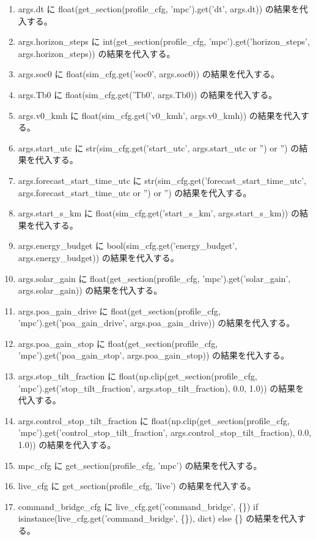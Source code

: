 \documentclass[a4paper,11pt]{article}
\begin{document}
\begin{enumerate}[leftmargin=1.8em]
\item args.dt に float(get\_section(profile\_cfg, 'mpc').get('dt', args.dt)) の結果を代入する。
\item args.horizon\_steps に int(get\_section(profile\_cfg, 'mpc').get('horizon\_steps', args.horizon\_steps)) の結果を代入する。
\item args.soc0 に float(sim\_cfg.get('soc0', args.soc0)) の結果を代入する。
\item args.Tb0 に float(sim\_cfg.get('Tb0', args.Tb0)) の結果を代入する。
\item args.v0\_kmh に float(sim\_cfg.get('v0\_kmh', args.v0\_kmh)) の結果を代入する。
\item args.start\_utc に str(sim\_cfg.get('start\_utc', args.start\_utc or '') or '') の結果を代入する。
\item args.forecast\_start\_time\_utc に str(sim\_cfg.get('forecast\_start\_time\_utc', args.forecast\_start\_time\_utc or '') or '') の結果を代入する。
\item args.start\_s\_km に float(sim\_cfg.get('start\_s\_km', args.start\_s\_km)) の結果を代入する。
\item args.energy\_budget に bool(sim\_cfg.get('energy\_budget', args.energy\_budget)) の結果を代入する。
\item args.solar\_gain に float(get\_section(profile\_cfg, 'mpc').get('solar\_gain', args.solar\_gain)) の結果を代入する。
\item args.poa\_gain\_drive に float(get\_section(profile\_cfg, 'mpc').get('poa\_gain\_drive', args.poa\_gain\_drive)) の結果を代入する。
\item args.poa\_gain\_stop に float(get\_section(profile\_cfg, 'mpc').get('poa\_gain\_stop', args.poa\_gain\_stop)) の結果を代入する。
\item args.stop\_tilt\_fraction に float(np.clip(get\_section(profile\_cfg, 'mpc').get('stop\_tilt\_fraction', args.stop\_tilt\_fraction), 0.0, 1.0)) の結果を代入する。
\item args.control\_stop\_tilt\_fraction に float(np.clip(get\_section(profile\_cfg, 'mpc').get('control\_stop\_tilt\_fraction', args.control\_stop\_tilt\_fraction), 0.0, 1.0)) の結果を代入する。
\item mpc\_cfg に get\_section(profile\_cfg, 'mpc') の結果を代入する。
\item live\_cfg に get\_section(profile\_cfg, 'live') の結果を代入する。
\item command\_bridge\_cfg に live\_cfg.get('command\_bridge', \{\}) if isinstance(live\_cfg.get('command\_bridge', \{\}), dict) else \{\} の結果を代入する。

\end{enumerate}
\end{document}
